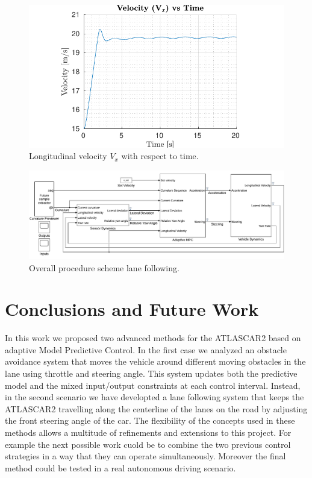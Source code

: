 \documentclass[conference, 11pt]{IEEEtran}
\begin{document}
\begin{figure}[!h]
	\centering
	\hspace*{-0.5in}
	\includegraphics[width=1.29\columnwidth]{../../MATLAB/lane_following/figure/LongitudinalVelocityVsTime.pdf}
	\caption{Longitudinal velocity $V_x$ with respect to time.}
	\label{fig:longitudinal_velocity_laneFollowing}
\end{figure}


\begin{figure}[!h]
	\centering
	\includegraphics[width=\textwidth]{./figure/lane_following_AMPC.pdf}
	\caption{Overall procedure scheme lane following.}
	\label{fig:scheme_lane_following}
\end{figure}


\section{Conclusions and Future Work}
In this work we proposed two advanced methods for the ATLASCAR2 based on adaptive Model Predictive Control. In the first case we analyzed an obstacle avoidance system that moves the vehicle around different moving obstacles in the lane using throttle and steering angle. This system updates both the predictive model and the mixed input/output constraints at each control interval. Instead, in the second scenario  we have developted a lane following system that keeps the ATLASCAR2 travelling along the centerline of the lanes on the road by adjusting the front steering angle of the car. The flexibility of the concepts used in these methods allows a multitude of refinements and extensions to this project. For example the next possible work cuold be to combine the two previous control strategies in a way that they can operate simultaneously. Moreover the final method could be tested in a real autonomous driving scenario.
\end{document}
